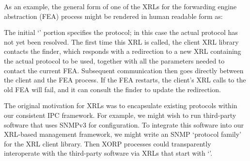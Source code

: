 As an example, the general form of one of the XRLs for the forwarding
engine abstraction (FEA) process might be rendered in human readable
form as:
%
\begin{figure}[h]
\vspace{-0.05in}
\centerline{}
\vspace{-0.1in}
\end{figure}

\noindent The initial `' portion specifies the protocol;
in this case the actual protocol has not yet been resolved.
The first time this XRL is called, the client XRL library
contacts the finder, which responds with a redirection to a new XRL
containing the actual protocol to be used, together with all the
parameters needed to contact the current FEA.
Subsequent communication then goes
directly between the client and the FEA process.
If the FEA restarts, the client's XRL calls to the old FEA will fail, and
it can consult the finder to update the redirection.


The original motivation for XRLs was to encapsulate existing
protocols within our consistent IPC framework.   For example, we
might wish to run third-party software that uses SNMPv3 for
configuration. 
To integrate this software into our XRL-based management framework, we
might write an SNMP `protocol family' for the XRL client library.
Then XORP processes could transparently interoperate with the third-party
software via XRLs that start with `'.

